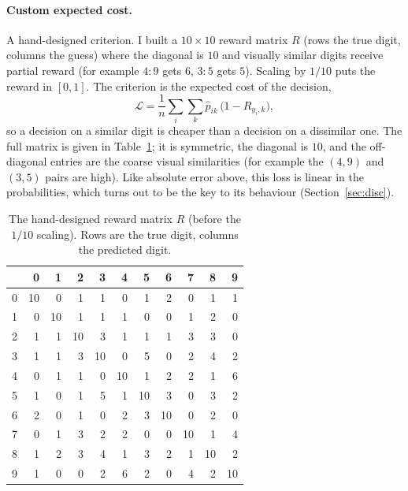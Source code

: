\documentclass[11pt]{article}
\newcommand{\Lc}{\mathcal{L}}
\begin{document}
\paragraph{Custom expected cost.} A hand-designed criterion. I built a $10\times10$ reward
matrix $R$ (rows the true digit, columns the guess) where the diagonal is $10$ and visually
similar digits receive partial reward (for example $4{:}9$ gets $6$, $3{:}5$ gets $5$). Scaling
by $1/10$ puts the reward in $[0,1]$. The criterion is the expected cost of the decision,
\begin{equation}
\Lc=\frac1n\sum_i\sum_k \hat p_{ik}\,\big(1-R_{y_i,k}\big),
\label{eq:expectedcost}
\end{equation}
so a decision on a similar digit is cheaper than a decision on a dissimilar one. The full matrix
is given in Table~\ref{tab:reward}; it is symmetric, the diagonal is $10$, and the off-diagonal
entries are the coarse visual similarities (for example the $(4,9)$ and $(3,5)$ pairs are high).
Like absolute error above, this loss is linear in the probabilities, which turns out to be the
key to its behaviour (Section~\ref{sec:disc}).

\begin{table}[htbp]
\centering
\small
\caption{The hand-designed reward matrix $R$ (before the $1/10$ scaling). Rows are the true
digit, columns the predicted digit.}
\label{tab:reward}
\begin{tabular}{@{}lrrrrrrrrrr@{}}
\toprule
 & 0 & 1 & 2 & 3 & 4 & 5 & 6 & 7 & 8 & 9 \\
\midrule
0 & 10 & 0 & 1 & 1 & 0 & 1 & 2 & 0 & 1 & 1 \\
1 & 0 & 10 & 1 & 1 & 1 & 0 & 0 & 1 & 2 & 0 \\
2 & 1 & 1 & 10 & 3 & 1 & 1 & 1 & 3 & 3 & 0 \\
3 & 1 & 1 & 3 & 10 & 0 & 5 & 0 & 2 & 4 & 2 \\
4 & 0 & 1 & 1 & 0 & 10 & 1 & 2 & 2 & 1 & 6 \\
5 & 1 & 0 & 1 & 5 & 1 & 10 & 3 & 0 & 3 & 2 \\
6 & 2 & 0 & 1 & 0 & 2 & 3 & 10 & 0 & 2 & 0 \\
7 & 0 & 1 & 3 & 2 & 2 & 0 & 0 & 10 & 1 & 4 \\
8 & 1 & 2 & 3 & 4 & 1 & 3 & 2 & 1 & 10 & 2 \\
9 & 1 & 0 & 0 & 2 & 6 & 2 & 0 & 4 & 2 & 10 \\
\bottomrule
\end{tabular}
\end{table}
\end{document}
